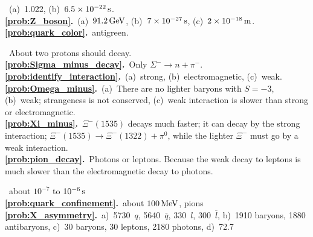 \medskip


~(a)~1.022,
(b)~$6.5\times 10^{-22}\,\mbox{s}$.\\
{\bf \ref{prob:Z_boson}.}~(a)~$91.2\,\mbox{GeV}$, 
(b)~$7\times 10^{-27}\,\mbox{s}$, (c)~$2\times 10^{-18}\,\mbox{m}$.\\
{\bf \ref{prob:quark_color}.}~antigreen.

\medskip


~About two protons should decay.\\
{\bf \ref{prob:Sigma_minus_decay}.}~Only $\Sigma^-\to n + \pi^-$.\\
{\bf \ref{prob:identify_interaction}.}~(a)~strong, (b)~electromagnetic, 
  (c)~weak.\\
{\bf \ref{prob:Omega_minus}.}~(a)~There are no lighter baryons with $S=-3$, (b)~weak; strangeness is not conserved, (c)~weak interaction
is slower than strong or electromagnetic.\\
{\bf \ref{prob:Xi_minus}.}~$\Xi^-(1535)$ decays much faster; it can 
  decay by the strong interaction; $\Xi^-(1535)\to \Xi^-(1322) +
  \pi^0$, while the lighter $\Xi^-$ must go by a weak interaction.\\
  {\bf \ref{prob:pion_decay}.}~Photons or leptons.  Because the weak 
  decay to leptons is much slower than the electromagnetic decay to photons.

\medskip


~about $10^{-7}$ to $10^{-6}\,\mbox{s}$ \\
{\bf \ref{prob:quark_confinement}.}~about $100\,\mbox{MeV}$, pions \\
{\bf \ref{prob:X_asymmetry}.}~a)~5730~$q$, 5640~$\bar q$, 330~$l$,
300~$\bar l$, b)~1910 baryons, 1880 antibaryons, c)~30 baryons, 30 leptons,
2180 photons, d)~72.7
